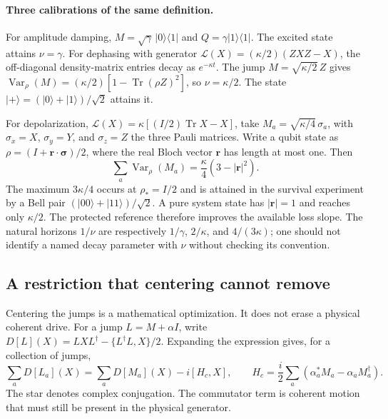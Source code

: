 \documentclass[11pt,a4paper]{article}
\numberwithin{equation}{section}
\theoremstyle{remark}
\DeclareMathOperator{\Tr}{Tr}
\DeclareMathOperator{\Var}{Var}
\begin{document}
\paragraph{Three calibrations of the same definition.}
For amplitude damping, $M=\sqrt\gamma\,|0\rangle\langle1|$ and
$Q=\gamma|1\rangle\langle1|$. The excited state attains $\nu=\gamma$.
For dephasing with generator
$\mathcal L(X)=(\kappa/2)(ZXZ-X)$, the off-diagonal density-matrix
entries decay as $e^{-\kappa t}$. The jump
$M=\sqrt{\kappa/2}\,Z$ gives
$\Var_\rho(M)=(\kappa/2)[1-\Tr(\rho Z)^2]$, so $\nu=\kappa/2$.
The state $|+\rangle=(|0\rangle+|1\rangle)/\sqrt2$ attains it.

For depolarization,
$\mathcal L(X)=\kappa[(I/2)\Tr X-X]$, take
$M_a=\sqrt{\kappa/4}\,\sigma_a$, with
$\sigma_x=X$, $\sigma_y=Y$, and $\sigma_z=Z$ the three Pauli matrices.
Write a qubit state as
$\rho=(I+\mathbf r\cdot\boldsymbol\sigma)/2$, where the real Bloch
vector $\mathbf r$ has length at most one. Then
\begin{equation}
 \sum_a\Var_\rho(M_a)=\frac\kappa4(3-|\mathbf r|^2).
\end{equation}
The maximum $3\kappa/4$ occurs at $\rho_*=I/2$ and is attained in the
survival experiment by a Bell pair
$(|00\rangle+|11\rangle)/\sqrt2$. A pure system state has
$|\mathbf r|=1$ and reaches only $\kappa/2$. The protected reference
therefore improves the available loss slope. The natural horizons
$1/\nu$ are respectively $1/\gamma$, $2/\kappa$, and $4/(3\kappa)$;
one should not identify a named decay parameter with $\nu$ without
checking its convention.

\subsection{A restriction that centering cannot remove}

Centering the jumps is a mathematical optimization. It does not erase a
physical coherent drive. For a jump $L=M+\alpha I$, write
$D[L](X)=LXL^\dagger-\{L^\dagger L,X\}/2$. Expanding the expression
gives, for a collection of jumps,
\begin{equation}
 \sum_aD[L_a](X)=\sum_aD[M_a](X)-i[H_c,X],\qquad
 H_c=\frac i2\sum_a(\alpha_a^*M_a-\alpha_aM_a^\dagger).
 \label{wit:centering-drift}
\end{equation}
The star denotes complex conjugation. The commutator term is coherent
motion that must still be present in the physical generator.
\end{document}
